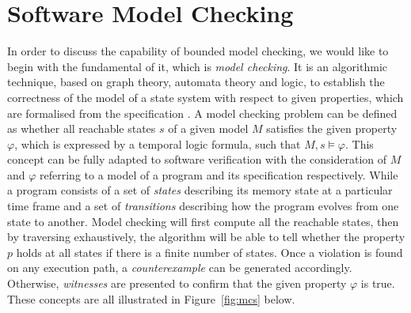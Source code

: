 \section{Software Model Checking} \label{sec:mc}
In order to discuss the capability of bounded model checking, we would like to begin with the fundamental of it, which is \textit{model checking}. It is an algorithmic technique, based on graph theory, automata theory and logic, \cite{Vardi2005} to establish the correctness of the model of a state system with respect to given properties, which are formalised from the specification \cite{Clarke:2000:MC:332656, Clarke:2008:BMC:1423535.1423536}. A model checking problem can be defined as whether all reachable states $s$ of a given model $M$ satisfies the given property $\varphi$, which is expressed by a temporal logic formula, such that $M, s \models \varphi$. This concept can be fully adapted to software verification with the consideration of $M$ and $\varphi$ referring to a model of a program and its specification respectively. While a program consists of a set of \textit{states} describing its memory state at a particular time frame and a set of \textit{transitions} describing how the program evolves from one state to another. Model checking will first compute all the reachable states, then by traversing exhaustively, the algorithm will be able to tell whether the property $p$ holds at all states if there is a finite number of states. Once a violation is found on any execution path, a \textit{counterexample} can be generated accordingly. Otherwise, \textit{witnesses} are presented to confirm that the given property $\varphi$ is true. These concepts are all illustrated in Figure~\ref{fig:mcs} below.




